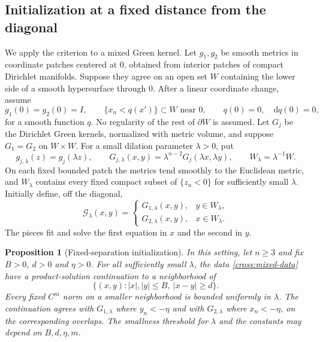\documentclass[11pt]{article}
\newtheorem{proposition}[theorem]{Proposition}
\theoremstyle{definition}
\theoremstyle{remark}
\newcommand{\dd}{\mathrm d}
\numberwithin{equation}{section}
\begin{document}
\subsection{Initialization at a fixed distance from the diagonal}

We apply the criterion to a mixed Green kernel.  Let $g_1,g_2$ be smooth
metrics in coordinate patches centered at $0$, obtained from interior
patches of compact Dirichlet manifolds.  Suppose they agree on an open
set $W$ containing the lower side of a smooth hypersurface through $0$.
After a linear coordinate change, assume
\[
 g_1(0)=g_2(0)=I,\qquad
 \{x_n<q(x')\}\subset W\text{ near }0,\qquad
 q(0)=0,\quad \dd q(0)=0,
\]
for a smooth function $q$.  No regularity of the rest of $\partial W$
is assumed.
Let $G_j$ be the Dirichlet Green kernels, normalized with metric volume,
and suppose $G_1=G_2$ on $W\times W$.
For a small dilation parameter $\lambda>0$, put
\begin{equation}\label{cross:dilation}
 g_{j,\lambda}(z)=g_j(\lambda z),\qquad
 G_{j,\lambda}(x,y)=\lambda^{n-2}G_j(\lambda x,\lambda y),
 \qquad W_\lambda=\lambda^{-1}W.
\end{equation}
On each fixed bounded patch the metrics tend smoothly to the Euclidean
metric, and $W_\lambda$ contains every fixed compact subset of
$\{z_n<0\}$ for sufficiently small $\lambda$.
Initially define, off the diagonal,
\begin{equation}\label{cross:mixed-data}
 \mathcal G_\lambda(x,y)=
 \begin{cases}
 G_{1,\lambda}(x,y),&y\in W_\lambda,\\
 G_{2,\lambda}(x,y),&x\in W_\lambda.
 \end{cases}
\end{equation}
The pieces fit and solve the first equation in $x$ and the second in $y$.

\begin{proposition}[Fixed-separation initialization]\label{cross:initial}
In this setting, let $n\ge3$ and fix $B>0$, $d>0$ and $\eta>0$.
For all sufficiently small $\lambda$, the data
\eqref{cross:mixed-data} have a product-solution continuation to a
neighborhood of
\[
 \{(x,y):|x|,|y|\le B,\ |x-y|\ge d\}.
\]
Every fixed $C^m$ norm on a smaller neighborhood is bounded uniformly
in $\lambda$.  The continuation agrees with $G_{1,\lambda}$ where
$y_n<-\eta$ and with $G_{2,\lambda}$ where $x_n<-\eta$, on the
corresponding overlaps.  The smallness threshold for $\lambda$ and
the constants may depend on $B,d,\eta,m$.
\end{proposition}
\end{document}
